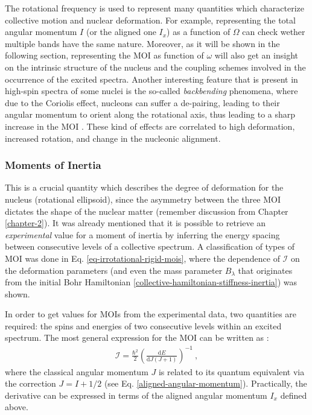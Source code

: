 The rotational frequency is used to represent many quantities which characterize collective motion and nuclear deformation. For example, representing the total angular momentum $I$ (or the aligned one $I_x$) as a function of $\Omega$ can check wether multiple bands have the same nature. Moreover, as it will be shown in the following section, representing the MOI as function of $\omega$ will also get an insight on the intrinsic structure of the nucleus and the coupling schemes involved in the occurrence of the excited spectra. Another interesting feature that is present in high-spin spectra of some nuclei is the so-called \emph{backbending} phenomena, where due to the Coriolis effect, nucleons can suffer a de-pairing, leading to their angular momentum to orient along the rotational axis, thus leading to a sharp increase in the MOI \cite{ring2004nuclear,kvasil2004backbending}. These kind of effects are correlated to high deformation, increased rotation, and change in the nucleonic alignment.

\subsubsection*{Moments of Inertia}

This is a crucial quantity which describes the degree of deformation for the nucleus (rotational ellipsoid), since the asymmetry between the three MOI dictates the shape of the nuclear matter (remember discussion from Chapter \ref{chapter-2}). It was already mentioned that it is possible to retrieve an \emph{experimental} value for a moment of inertia by inferring the energy spacing between consecutive levels of a collective spectrum. A classification of types of MOI was done in Eq. \ref{eq-irrotational-rigid-mois}, where the dependence of $\mathcal{I}$ on the deformation parameters (and even the mass parameter $B_\lambda$ that originates from the initial Bohr Hamiltonian \ref{collective-hamiltonian-stiffness-inertia}) was shown.

In order to get values for MOIs from the experimental data, two quantities are required: the spins and energies of two consecutive levels within an excited spectrum. The most general expression for the MOI can be written as \cite{ahmad2021backbending}:
\begin{align}
    \mathcal{I}=\frac{\hbar^2}{2}\left(\frac{\text{d}E}{\text{d}J(J+1)}\right)^{-1}\ ,
\end{align}
where the classical angular momentum $J$ is related to its quantum equivalent via the correction $J=I+1/2$ (see Eq. \ref{aligned-angular-momentum}). Practically, the derivative can be expressed in terms of the aligned angular momentum $I_x$ defined above.

